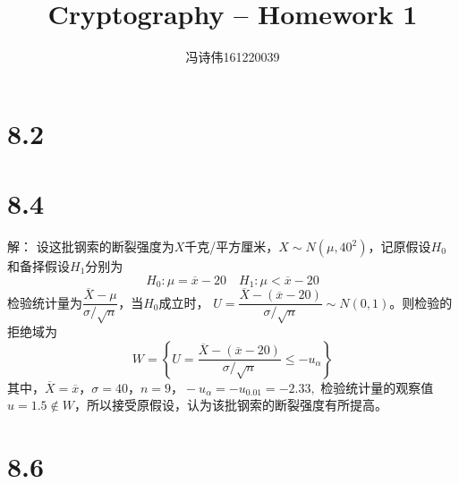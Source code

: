 \documentclass[a4papers]{ctexart}
\title{Cryptography -- Homework 1}
\author{冯诗伟161220039}
\date{}
\begin{document}
\maketitle
\section{8.2}

\section{8.4}
解：
\indent 设这批钢索的断裂强度为$X$千克/平方厘米，$X \sim N(\mu,40^2)$，记原假设$H_0$和备择假设$H_1$分别为
\[
    H_0: \mu =\overline x - 20 \quad H_1 :\mu < \overline x - 20
    \]
检验统计量为$\dfrac{\overline X -\mu}{\sigma / \sqrt{n}}$，当$H_0$成立时，
$U=\dfrac{\overline X -(\overline x - 20)}{\sigma / \sqrt{n}}\sim N(0,1)$。则检验的拒绝域为
\[
    W = \left\{ U=\dfrac{\overline X -(\overline x - 20)}{\sigma / \sqrt{n}} \le -u_{\alpha} \right\}
    \]
其中，$\overline X=\overline x，\sigma = 40，n=9，-u_{\alpha}=-u_{0.01}=-2.33,$
检验统计量的观察值$u=1.5\notin W，$所以接受原假设，认为该批钢索的断裂强度有所提高。

\section{8.6}
\end{document}
